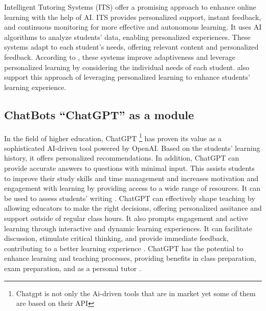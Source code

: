 Intelligent Tutoring Systems (ITS) offer a promising approach to enhance online learning with the help of AI. 
ITS provides personalized support, instant feedback, and continuous monitoring for more effective and autonomous learning. 
It uses AI algorithms to analyze students' data, enabling personalized experiences. These systems adapt to each student's needs, 
offering relevant content and personalized feedback. According to \citep{l_d_of_cs_akshara_first_grade_college_2023}, these systems improve adaptiveness and leverage 
personalized learning by considering the individual needs of each student. \citep{bradac_design_2022} also support this approach 
of leveraging personalized learning to enhance students' learning experience.


\subsection{ChatBots ``ChatGPT'' as a module}

In the field of higher education, ChatGPT \footnote{Chatgpt is not only the Ai-driven tools that are in market yet some 
of them are based on their API
} has proven its value as a sophisticated AI-driven tool powered by OpenAI. 
Based on the students' learning history, it offers personalized recommendations. In addition, ChatGPT can provide 
accurate answers to questions with minimal input. This assists students to improve their study skills and time 
management and increases motivation and engagement with learning by providing access to a wide range of resources. It can
be used to assess students' writing \citep{mohammed_exploring_2023}. 
ChatGPT can effectively shape teaching by allowing educators to make the right decisions, 
offering personalized assitance and support outside of regular class hours. It also prompts engagement and active 
learning through interactive and dynamic learning experiences. It can facilitate discussion, stimulate critical thinking, 
and provide immediate feedback, contributing to a better learning experience \citep{schonberger_chatgpt_2023}. 
ChatGPT has the potential to enhance learning and teaching processes, providing benefits in class 
preparation, exam preparation, and as a personal tutor \citep{domenech_chatgpt_2023}. 

